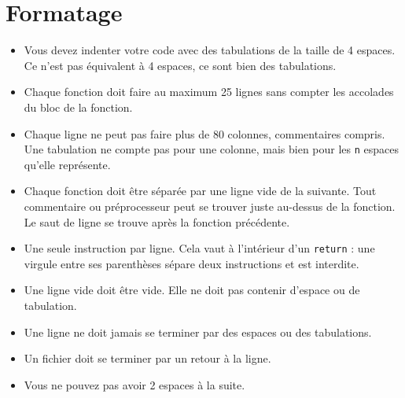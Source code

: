 \documentclass{42-fr}
\begin{document}
    \section{Formatage}

            \begin{itemize}

                \item Vous devez indenter votre code avec des tabulations de la taille de 4 espaces. 
                    Ce n’est pas équivalent à 4 espaces, ce sont bien des tabulations.

                \item Chaque fonction doit faire au maximum 25 lignes 
                    sans compter les accolades du bloc de la fonction.

                \item Chaque ligne ne peut pas faire plus de 80 colonnes, commentaires compris. 
                    Une tabulation ne compte pas pour une colonne, mais bien pour les \texttt{n} espaces qu’elle représente.

                \item Chaque fonction doit être séparée par une ligne vide de la suivante. 
                    Tout commentaire ou préprocesseur peut se trouver juste au-dessus
                    de la fonction. Le saut de ligne se trouve après la fonction précédente.

                \item Une seule instruction par ligne. Cela vaut à l’intérieur d’un
                \texttt{return} : une virgule entre ses parenthèses sépare deux instructions
                et est interdite.

                \item Une ligne vide doit être vide. Elle ne doit pas contenir d’espace ou de tabulation.

                \item Une ligne ne doit jamais se terminer par des espaces ou des tabulations.

            \item Un fichier doit se terminer par un retour à la ligne.

                \item Vous ne pouvez pas avoir 2 espaces à la suite.


\end{itemize}
\end{document}
